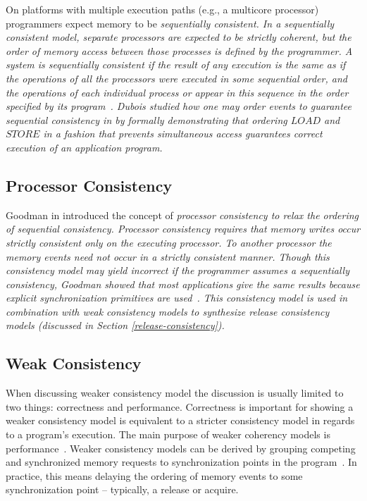 On platforms with multiple execution paths (e.g., a multicore processor) programmers expect memory to be \em sequentially consistent\em.  In a \em sequentially consistent \em model, separate processors are expected to be \em strictly coherent\em, but the order of memory access between those processes is defined by the programmer.  A system is sequentially consistent if the result of any execution is the same as if the operations of all the processors were executed in some sequential order, and the operations of each individual process or appear in this sequence in the order specified by its program~\cite{Lamport:1979:MMC:1311099.1311750}.  Dubois studied how one may order events to guarantee sequential consistency in \cite{Scheurich:1987:CMO:30350.30377} by formally demonstrating that ordering $LOAD$ and $STORE$ in a fashion that prevents simultaneous access guarantees correct execution of an application program. 

\subsection{Processor Consistency}

Goodman in \cite{Goodman:1989:53705} introduced the concept of \em processor consistency \em to relax the ordering of \em sequential consistency\em.  Processor consistency requires that memory writes occur strictly consistent only on the executing processor.  To another processor the memory events need not occur in a strictly consistent manner.  Though this consistency model may yield incorrect if the programmer assumes a sequentially consistency, Goodman showed that most applications give the same results because explicit synchronization primitives are used~\cite{Goodman:1989:53705}.  This consistency model is used in combination with weak consistency models to synthesize release consistency models (discussed in Section \ref{release-consistency}).

\subsection{Weak Consistency}
\label{weak-consistency}

When discussing weaker consistency model the discussion is usually limited to two things: correctness and performance.  Correctness is important for showing a weaker consistency model is equivalent to a stricter consistency model in regards to a program's execution.  The main purpose of weaker coherency models is performance~\cite{Gharachorloo:1990:MCE:325164.325102}.  Weaker consistency models can be derived by grouping competing and synchronized memory requests to synchronization points in the program~\cite{Gharachorloo:1990:MCE:325164.325102}.  In practice, this means delaying the ordering of memory events to some synchronization point -- typically, a release or acquire.

